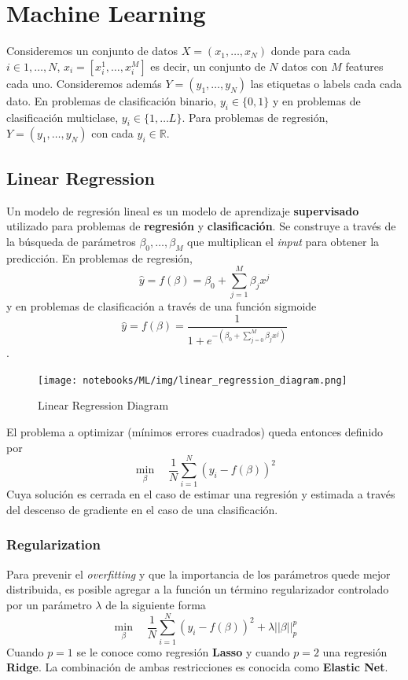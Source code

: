 \section{Machine Learning}

Consideremos un conjunto de datos $X = (x_1, \dots , x_N)$ donde para cada $i \in {1, \dots, N}$, $x_i = [x_{i}^1 , \dots, x_{i}^M]$ es decir, un conjunto de $N$ datos con $M$ features cada uno. Consideremos además $Y = (y_1, \dots , y_N)$ las etiquetas o labels cada cada dato. En problemas de clasificación binario, $y_i \in \{ 0, 1\}$ y en problemas de clasificación multiclase, $y_i \in \{1, \dots L\}$. Para problemas de regresión, $Y = (y_1, \dots , y_N)$ con cada $y_i \in \mathbb{R}$.

\subsection{Linear Regression}

Un modelo de regresión lineal es un modelo de aprendizaje \textbf{supervisado} utilizado para problemas de \textbf{regresión} y \textbf{clasificación}. Se construye a través de la búsqueda de parámetros $\beta_0, \dots, \beta_M$ que multiplican el \textit{input} para obtener la predicción. En problemas de regresión, 
$$\hat{y} = f(\beta) = \beta_0 + \sum_{j=1}^M \beta_j x^j$$
y en problemas de clasificación a través de una función sigmoide 
$$\hat{y} = f(\beta) = \frac{1}{1+e^{- (\beta_0 + \sum_{j=0}^M \beta_j x^j)}}$$.

\begin{figure}[H]
    \center
    \texttt{[image: notebooks/ML/img/linear\_regression\_diagram.png]}
    \caption{Linear Regression Diagram}
\end{figure}

El problema a optimizar (mínimos errores cuadrados) queda entonces definido por 
$$\min_{\beta} \quad \frac{1}{N}\sum_{i=1}^N(y_i - f(\beta))^2$$
Cuya solución es cerrada en el caso de estimar una regresión y estimada a través del descenso de gradiente en el caso de una clasificación. 

\subsubsection{Regularization}

Para prevenir el \textit{overfitting} y que la importancia de los parámetros quede mejor distribuida, es posible agregar a la función un término regularizador controlado por un parámetro $\lambda$ de la siguiente forma 
$$\min_{\beta} \quad \frac{1}{N}\sum_{i=1}^N(y_i - f(\beta))^2 + \lambda ||\beta||^{p}_{p}$$
Cuando $p=1$ se le conoce como regresión \textbf{Lasso} y cuando $p=2$ una regresión \textbf{Ridge}. La combinación de ambas restricciones es conocida como \textbf{Elastic Net}. 

